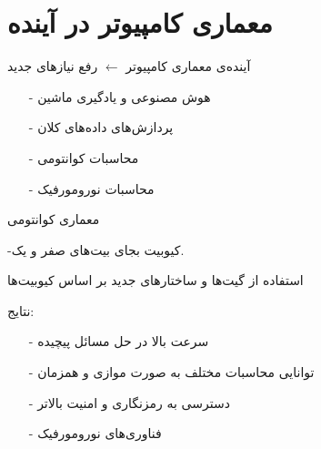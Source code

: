 \section{معماری کامپیوتر در آینده}
\begin{frame}{آینده‌ی معماری کامپیوتر $\leftarrow$ رفع نیاز‌های جدید}
\begin{itemize}\itemr
\item[-]
هوش مصنوعی و یادگیری ماشین
\item[-]
پردازش‌‌های داده‌های کلان
\item[-]
محاسبات کوانتومی
\item[-]
محاسبات نورومورفیک
\end{itemize}
\end{frame}

\begin{frame}{معماری کوانتومی}
\begin{center}
-کیوبیت بجای بیت‌های صفر و یک.

استفاده از گیت‌ها و ساختار‌های جدید بر اساس کیوبیت‌ها
\end{center}
\begin{flushright}
نتایج:
\end{flushright}
\begin{itemize}\itemr
\item[-]
سرعت بالا در حل مسائل پیچیده
\item[-]
توانایی محاسبات مختلف به صورت موازی و همزمان
\item[-]
دسترسی به رمزنگاری و امنیت بالاتر
\item[-]
فناوری‌های نورومورفیک
\end{itemize}
\end{frame}